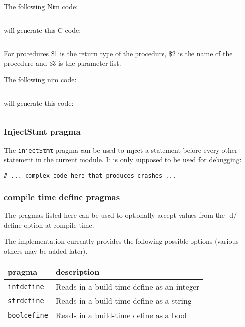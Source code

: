 The following Nim code:

\begin{verbatim}
\end{verbatim}

will generate this C code:

\begin{verbatim}
\end{verbatim}

For procedures \$1 is the return type of the procedure, \$2 is the name
of the procedure and \$3 is the parameter list.

The following nim code:

\begin{verbatim}
\end{verbatim}

will generate this code:

\begin{verbatim}
\end{verbatim}

\hypertarget{injectstmt-pragma}{%
\subsubsection{InjectStmt pragma}\label{injectstmt-pragma}}

The \texttt{injectStmt} pragma can be used to inject a statement before
every other statement in the current module. It is only supposed to be
used for debugging:

\begin{verbatim}
# ... complex code here that produces crashes ...
\end{verbatim}

\hypertarget{compile-time-define-pragmas}{%
\subsubsection{compile time define
pragmas}\label{compile-time-define-pragmas}}

The pragmas listed here can be used to optionally accept values from the
-d/-\/-define option at compile time.

The implementation currently provides the following possible options
(various others may be added later).

\begin{longtable}[]{@{}ll@{}}
\toprule
pragma & description\tabularnewline
\midrule
\endhead
\texttt{intdefine} & Reads in a build-time define as an
integer\tabularnewline
\texttt{strdefine} & Reads in a build-time define as a
string\tabularnewline
\texttt{booldefine} & Reads in a build-time define as a
bool\tabularnewline
\bottomrule
\end{longtable}

